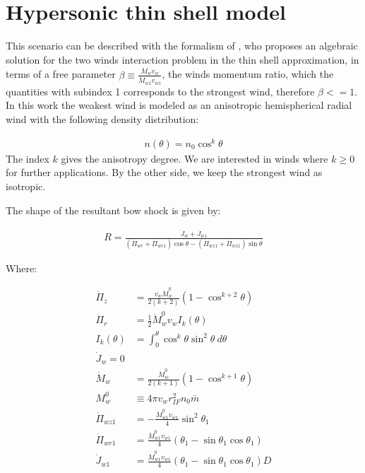 \newcommand\thC{\(\theta^1\)\,Ori~C}
\newcommand\CRW{\citetalias{Canto:1996}}

\section{Hypersonic thin shell model}
\label{sec:crw-scenario}
This scenario can be described with the formalism of
\citet[][hereafter \CRW{}]{Canto:1996}, who proposes an algebraic
solution for the two winds interaction problem in the thin shell
approximation, in terms of a free parameter
$\beta\equiv\frac{\dot{M}_wv_w}{\dot{M}_{w1}v_{w1}}$, the winds
momentum ratio, which the quantities with subindex 1 corresponds to
the strongest wind, therefore $\beta<=1$. In this work the weakest wind is modeled as an anisotropic hemispherical radial wind
with the following density distribution:

\begin{align}
  n(\theta) = n_0\cos^k\theta
\end{align}  
The index $k$ gives the anisotropy degree. We are interested in winds where $k \geq 0$ for further applications. By the other side, we keep the strongest
wind as isotropic.

The shape of the resultant bow shock is given by:

\begin{align}
  R = \frac{\dot{J}_w + \dot{J}_{w1}}{\left(\dot{\Pi}_{wr}+\dot{\Pi}_{wr1}\right)\cos\theta-\left(\dot{\Pi}_{wz1}+\dot{\Pi}_{wz1}\right)\sin\theta}
  \label{eq:Rmom}
\end{align}

Where:

\begin{align}
\dot{\Pi}_z &= \frac{v_w\dot{M}_w^0}{2(k+2)}\left(1-\cos^{k+2}\theta\right)  \label{eq:pir}\\
\dot{\Pi}_r &= \frac{1}{2}\dot{M}^0_w v_w I_k (\theta) \label{eq:piz}\\
I_k(\theta) & = \int^\theta_0 \cos^k \theta \sin^2\theta~d\theta \\
\dot{J}_w = 0 \label{eq:jdot} \\
\dot{M}_w &= \frac{\dot{M}_w^0}{2(k+1)}\left(1-\cos^{k+1}\theta\right) \label{eq:dotprop} \\
M^0_w &\equiv 4\pi v_w r^2_{IF} n_0 \bar{m}\\
\dot{\Pi}_{wz1} & = -\frac{\dot{M}^0_{w1}v_{w1}}{4}\sin^2\theta_1\\
\dot{\Pi}_{wr1} & = \frac{\dot{M}^0_{w1}v_{w1}}{4}\left(\theta_1-\sin\theta_1\cos\theta_1\right)\\
\dot{J}_{w1} & = \frac{\dot{M}^0_{w1}v_{w1}}{4}\left(\theta_1-\sin\theta_1\cos\theta_1\right)D \label{eq:jdot1}
\end{align}

